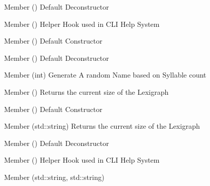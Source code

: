 \begin{DoxyRefList}
\item[Member \doxylink{class_help_utilz_a24a4fe0d4649fee5bd2ea497a1c49519}{Help\+Utilz\+::\texorpdfstring{$\sim$}{\string~}\+Help\+Utilz} ()]\label{todo__todo000187}%
%
Default Deconstructor  
\item[Member \doxylink{class_item_a4335de04eccc6741f2e2ef2d602cde4e}{Item\+::\+\_\+help} ()]\label{todo__todo000104}%
%
Helper Hook used in CLI Help System  
\item[Member \doxylink{class_item_a297720c02984eab37332ae795d22189d}{Item\+::Item} ()]\label{todo__todo000103}%
%
Default Constructor  
\item[Member \doxylink{class_item_a11663c84075b78c3ae5e30fdfcd7c458}{Item\+::\texorpdfstring{$\sim$}{\string~}\+Item} ()]\label{todo__todo000105}%
%
Default Deconstructor  
\item[Member \doxylink{class_lexicon_a0f490446d8e01b2e814f37b66f0e093a}{Lexicon\+::generate\+Name} (int)]\label{todo__todo000107}%
%
Generate A random Name based on Syllable count  
\item[Member \doxylink{class_lexicon_afd43c6e75ae64e241631d6d8d4d47350}{Lexicon\+::get\+Lexigraph\+Size} ()]\label{todo__todo000108}%
%
Returns the current size of the Lexigraph  
\item[Member \doxylink{class_lexicon_aa62f83480879f9c6489633cb83a0736f}{Lexicon\+::Lexicon} ()]\label{todo__todo000106}%
%
Default Constructor  
\item[Member \doxylink{class_lexicon_a3b19ad271a38917ebb7547ea3e6586dc}{Lexicon\+::set\+Lexigraph} (std\+::string)]\label{todo__todo000109}%
%
Returns the current size of the Lexigraph  
\item[Member \doxylink{class_lexicon_a3c7224c29de2b05503992938986fd665}{Lexicon\+::\texorpdfstring{$\sim$}{\string~}\+Lexicon} ()]\label{todo__todo000110}%
%
Default Deconstructor  
\item[Member \doxylink{class_logger_a4074bf3a723b9d886ef93bd9f55999ec}{Logger\+::\+\_\+help} ()]\label{todo__todo000117}%
%
Helper Hook used in CLI Help System  
\item[Member \doxylink{class_logger_a2c05fb76cb7383df07e34a0795f69217}{Logger\+::alert\+\_\+log} (std\+::string, std\+::string)]\label{todo__todo000113}%
%

\end{DoxyRefList}

